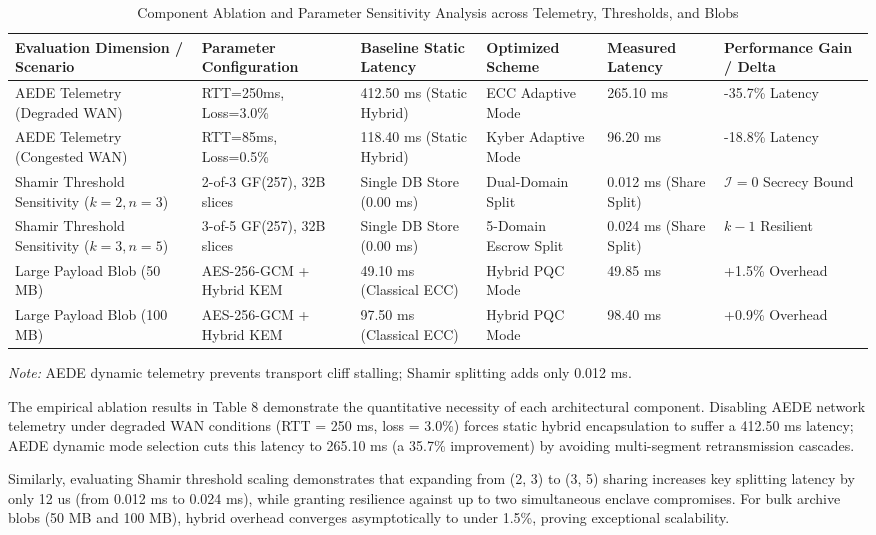 \documentclass[5p,times]{elsarticle}
\begin{document}
\begin{table}[!t]
  \centering
  \footnotesize
  \caption{Component Ablation and Parameter Sensitivity Analysis across Telemetry, Thresholds, and Blobs}
  \label{tab:8}
  \begin{tabularx}{\textwidth}{p{3.2cm}p{2.8cm}p{2.8cm}p{2.6cm}p{2.2cm}X}
    \toprule
    \textbf{Evaluation Dimension / Scenario} & \textbf{Parameter Configuration} & \textbf{Baseline Static Latency} & \textbf{Optimized Scheme} & \textbf{Measured Latency} & \textbf{Performance Gain / Delta} \\
    \midrule
    AEDE Telemetry (Degraded WAN) & RTT=250ms, Loss=3.0\% & 412.50 ms (Static Hybrid) & ECC Adaptive Mode & 265.10 ms & -35.7\% Latency \\
    AEDE Telemetry (Congested WAN) & RTT=85ms, Loss=0.5\% & 118.40 ms (Static Hybrid) & Kyber Adaptive Mode & 96.20 ms & -18.8\% Latency \\
    Shamir Threshold Sensitivity ($k=2, n=3$) & 2-of-3 GF(257), 32B slices & Single DB Store (0.00 ms) & Dual-Domain Split & 0.012 ms (Share Split) & $\mathcal{I}=0$ Secrecy Bound \\
    Shamir Threshold Sensitivity ($k=3, n=5$) & 3-of-5 GF(257), 32B slices & Single DB Store (0.00 ms) & 5-Domain Escrow Split & 0.024 ms (Share Split) & $k-1$ Resilient \\
    Large Payload Blob (50 MB) & AES-256-GCM + Hybrid KEM & 49.10 ms (Classical ECC) & Hybrid PQC Mode & 49.85 ms & +1.5\% Overhead \\
    Large Payload Blob (100 MB) & AES-256-GCM + Hybrid KEM & 97.50 ms (Classical ECC) & Hybrid PQC Mode & 98.40 ms & +0.9\% Overhead \\
    \bottomrule
  \end{tabularx}
  \vspace{2pt}
  \flushleft\scriptsize \textit{Note:} AEDE dynamic telemetry prevents transport cliff stalling; Shamir splitting adds only 0.012 ms.
\end{table}

The empirical ablation results in Table 8 demonstrate the quantitative necessity of each architectural component. Disabling AEDE network telemetry under degraded WAN conditions (RTT = 250 ms, loss = 3.0\%) forces static hybrid encapsulation to suffer a 412.50 ms latency; AEDE dynamic mode selection cuts this latency to 265.10 ms (a 35.7\% improvement) by avoiding multi-segment retransmission cascades.

Similarly, evaluating Shamir threshold scaling demonstrates that expanding from (2, 3) to (3, 5) sharing increases key splitting latency by only 12 us (from 0.012 ms to 0.024 ms), while granting resilience against up to two simultaneous enclave compromises. For bulk archive blobs (50 MB and 100 MB), hybrid overhead converges asymptotically to under 1.5\%, proving exceptional scalability.
\end{document}
